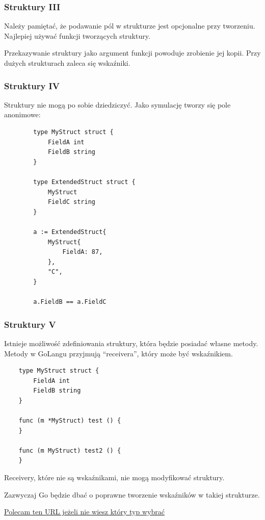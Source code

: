 \documentclass[10pt]{beamer}
\newcommand{\quotes}[1]{``#1''}
\begin{document}
\begin{frame}
    \frametitle{Struktury III} 
    Należy pamiętać, że podawanie pól w strukturze jest opcjonalne przy tworzeniu.
    Najlepiej używać funkcji tworzących struktury.

    Przekazywanie struktury jako argument funkcji powoduje zrobienie jej kopii.
    Przy dużych strukturach zaleca się wskaźniki.

\end{frame}

\begin{frame}[fragile]
    \frametitle{Struktury IV} 
    Struktury nie mogą po sobie dziedziczyć. Jako symulację tworzy się pole anonimowe:
    
    \begin{verbatim}
        type MyStruct struct {
            FieldA int
            FieldB string
        }

        type ExtendedStruct struct {
            MyStruct
            FieldC string
        }

        a := ExtendedStruct{
            MyStruct{
                FieldA: 87,
            },
            "C",
        }

        a.FieldB == a.FieldC
    \end{verbatim}
\end{frame}

\begin{frame}[fragile]
    \frametitle{Struktury V}
    Istnieje możliwość zdefiniowania struktury, która będzie posiadać własne metody.
    Metody w GoLangu przyjmują \quotes{receivera}, który może być wskaźnikiem.
    
    \begin{verbatim}
    type MyStruct struct {
        FieldA int
        FieldB string
    }

    func (m *MyStruct) test () {
    }

    func (m MyStruct) test2 () {
    }
    \end{verbatim}

    Receivery, które nie są wskaźnikami, nie mogą modyfikować struktury.

    Zazwyczaj Go będzie dbać o poprawne tworzenie wskaźników w takiej strukturze.

    \href{https://github.com/golang/go/wiki/CodeReviewComments#receiver-type}{Polecam ten URL jeżeli nie wiesz który typ wybrać}
\end{frame}
    
\end{document}
